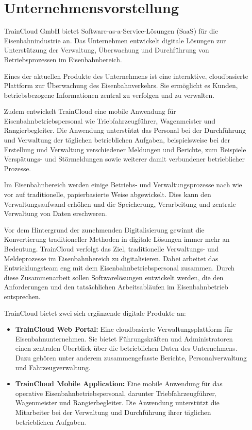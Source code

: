 \section{Unternehmensvorstellung}

TrainCloud GmbH bietet Software-as-a-Service-Lösungen (SaaS) für die Eisenbahnindustrie an. 
Das Unternehmen entwickelt digitale Lösungen zur Unterstützung der Verwaltung, Überwachung 
und Durchführung von Betriebsprozessen im Eisenbahnbereich. 

Eines der aktuellen Produkte des Unternehmens ist eine interaktive, cloudbasierte Plattform 
zur Überwachung des Eisenbahnverkehrs. Sie ermöglicht es Kunden, betriebsbezogene Informationen 
zentral zu verfolgen und zu verwalten. 

Zudem entwickelt TrainCloud eine mobile Anwendung für Eisenbahnbetriebspersonal wie Triebfahrzeugführer, 
Wagenmeister und Rangierbegleiter. Die Anwendung unterstützt das Personal bei der Durchführung und Verwaltung 
der täglichen betrieblichen Aufgaben, beispielsweise bei der Erstellung und Verwaltung verschiedener Meldungen 
und Berichte, zum Beispiele Verspätungs- und Störmeldungen sowie weiterer damit verbundener betrieblicher Prozesse.

Im Eisenbahnbereich werden einige Betriebs- und Verwaltungsprozesse nach wie vor auf traditionelle, papierbasierte Weise abgewickelt. 
Dies kann den Verwaltungsaufwand erhöhen und die Speicherung, Verarbeitung und zentrale Verwaltung von Daten erschweren. 

Vor dem Hintergrund der zunehmenden Digitalisierung gewinnt die Konvertierung traditioneller Methoden in digitale Lösungen 
immer mehr an Bedeutung. TrainCloud verfolgt das Ziel, traditionelle Verwaltungs- und Meldeprozesse im Eisenbahnbereich zu digitalisieren. 
Dabei arbeitet das Entwicklungsteam eng mit dem Eisenbahnbetriebspersonal zusammen. 
Durch diese Zusammenarbeit sollen Softwarelösungen entwickelt werden, die den Anforderungen 
und den tatsächlichen Arbeitsabläufen im Eisenbahnbetrieb entsprechen.

TrainCloud bietet zwei sich ergänzende digitale Produkte an:
\begin{itemize}
    \item \textbf{TrainCloud Web Portal:} Eine cloudbasierte Verwaltungsplattform für Eisenbahnunternehmen.
    Sie bietet Führungskräften und Administratoren einen zentralen Überblick über die betrieblichen Daten des Unternehmens. 
    Dazu gehören unter anderem zusammengefasste Berichte, Personalverwaltung und Fahrzeugverwaltung. 

    \item \textbf{TrainCloud Mobile Application:} Eine mobile Anwendung für das operative Eisenbahnbetriebspersonal, darunter Triebfahrzeugführer, 
    Wagenmeister und Rangierbegleiter. Die Anwendung unterstützt die Mitarbeiter bei der Verwaltung und Durchführung ihrer täglichen betrieblichen 
    Aufgaben.
\end{itemize}

